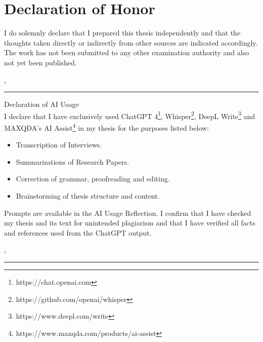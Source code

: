 %
\chapter*{Declaration of Honor}
\label{sec:declaration}
\thispagestyle{empty}

\vspace*{-10mm}

I do solemnly declare that I prepared this thesis independently and that the thoughts taken directly or indirectly from other sources are indicated accordingly.
The work has not been submitted to any other examination authority and also not
yet been published.

\bigskip

\noindent\textit{\thesisUniversityCity, \thesisDate}

\smallskip

\begin{flushright}
	\begin{minipage}{5cm}
		\rule{\textwidth}{1pt}
		\centering\thesisName
	\end{minipage}
\end{flushright}

\vspace*{10mm}

{Declaration of AI Usage} \\

I declare that I have exclusively used ChatGPT 4\footnote{https://chat.openai.com}, Whisper\footnote{https://github.com/openai/whisper}, DeepL Write\footnote{https://www.deepl.com/write} and MAXQDA's AI Assist\footnote{https://www.maxqda.com/products/ai-assist} in my thesis for the purposes listed below:

\begin{itemize}
	\item Transcription of Interviews.
	\item Summarizations of Research Papers.
	\item Correction of grammar, proofreading and editing.
	\item Brainstorming of thesis structure and content.
\end{itemize}

Prompts are available in the AI Usage Reflection.
I confirm that I have checked my thesis and its text for unintended plagiarism and that I have verified all facts and references used from the ChatGPT output.

\bigskip

\noindent\textit{\thesisUniversityCity, \thesisDate}

\smallskip

\begin{flushright}
	\begin{minipage}{5cm}
		\rule{\textwidth}{1pt}
		\centering\thesisName
	\end{minipage}
\end{flushright}

